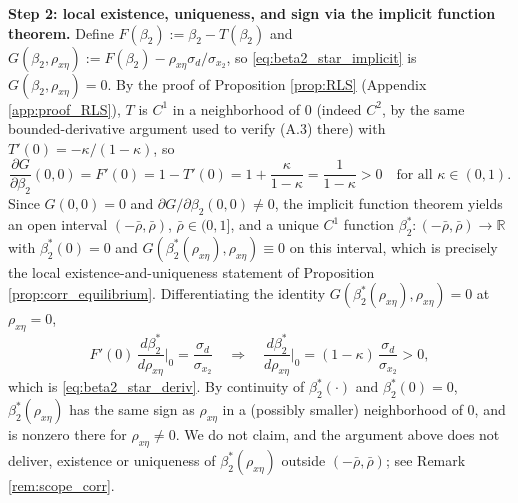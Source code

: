 \textbf{Step 2: local existence, uniqueness, and sign via the implicit function theorem.} Define
$F(\beta_2):=\beta_2-T(\beta_2)$ and $G(\beta_2,\rho_{x\eta}):=F(\beta_2)-\rho_{x\eta}\sigma_d/\sigma_{x_2}$,
so \eqref{eq:beta2_star_implicit} is $G(\beta_2,\rho_{x\eta})=0$. By the proof of Proposition
\ref{prop:RLS} (Appendix \ref{app:proof_RLS}), $T$ is $C^1$ in a neighborhood of $0$ (indeed $C^2$, by
the same bounded-derivative argument used to verify (A.3) there) with $T'(0)=-\kappa/(1-\kappa)$, so
\[
\frac{\partial G}{\partial\beta_2}(0,0)=F'(0)=1-T'(0)=1+\frac{\kappa}{1-\kappa}=\frac{1}{1-\kappa}>0
\quad\text{for all }\kappa\in(0,1).
\]
Since $G(0,0)=0$ and $\partial G/\partial\beta_2(0,0)\neq0$, the implicit function theorem yields an
open interval $(-\bar\rho,\bar\rho)$, $\bar\rho\in(0,1]$, and a unique $C^1$ function
$\beta_2^*:(-\bar\rho,\bar\rho)\to\mathbb R$ with $\beta_2^*(0)=0$ and
$G(\beta_2^*(\rho_{x\eta}),\rho_{x\eta})\equiv0$ on this interval, which is precisely the local
existence-and-uniqueness statement of Proposition \ref{prop:corr_equilibrium}. Differentiating the
identity $G(\beta_2^*(\rho_{x\eta}),\rho_{x\eta})=0$ at $\rho_{x\eta}=0$,
\[
F'(0)\,\frac{d\beta_2^*}{d\rho_{x\eta}}\bigg|_0 = \frac{\sigma_d}{\sigma_{x_2}}
\quad\Longrightarrow\quad
\frac{d\beta_2^*}{d\rho_{x\eta}}\bigg|_0 = (1-\kappa)\,\frac{\sigma_d}{\sigma_{x_2}}>0,
\]
which is \eqref{eq:beta2_star_deriv}. By continuity of $\beta_2^*(\cdot)$ and $\beta_2^*(0)=0$,
$\beta_2^*(\rho_{x\eta})$ has the same sign as $\rho_{x\eta}$ in a (possibly smaller) neighborhood of
$0$, and is nonzero there for $\rho_{x\eta}\neq0$. We do not claim, and the argument above does not
deliver, existence or uniqueness of $\beta_2^*(\rho_{x\eta})$ outside $(-\bar\rho,\bar\rho)$; see Remark
\ref{rem:scope_corr}.

